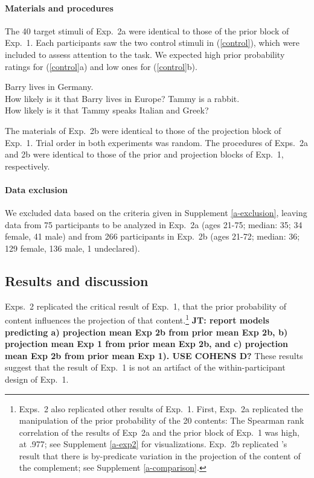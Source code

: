\documentclass[11pt,fleqn]{article}
\newcommand{\6}{\mbox{$[\hspace*{-.6mm}[$}}
\newcommand{\9}{\mbox{$]\hspace*{-.6mm}]$}}
\newcommand{\citepos}[1]{\citeauthor{#1}'s \citeyear{#1}}
\newcommand{\jt}[1]{\textbf{\color{blue}JT: #1}}
\begin{document}
\paragraph{Materials and procedures} The 40 target stimuli of Exp.~2a were identical to those of the prior block of Exp.~1. Each participants saw the two control stimuli in (\ref{control}), which were included to assess attention to the task. We expected high prior probability ratings for (\ref{control}a) and low ones for (\ref{control}b). 

\begin{exe}
\ex\label{control2}
\begin{xlist}
 Barry lives in Germany. \\ How likely is it that Barry lives in Europe?
 Tammy is a rabbit. \\ How likely is it that Tammy speaks Italian and Greek?
\end{xlist}
\end{exe}
The materials of Exp.~2b were identical to those of the projection block of Exp.~1. Trial order in both experiments was random. The procedures of Exps.~2a and 2b were identical to those of the prior and projection blocks of Exp.~1, respectively.

\paragraph{Data exclusion} We excluded data based on the criteria given in Supplement \ref{a-exclusion}, leaving data from 75 participants to be analyzed in Exp.~2a (ages 21-75; median: 35; 34 female, 41 male) and from 266 participants in Exp.~2b (ages 21-72; median: 36; 129 female, 136 male, 1 undeclared).

\subsection{Results and discussion}

Exps.~2 replicated the critical result of Exp.~1, that the prior probability of content influences the projection of that content.\footnote{Exps.~2 also replicated other results of Exp.~1. First, Exp.~2a replicated the manipulation of the prior probability of the 20 contents: The Spearman rank correlation of the results of Exp~2a and the prior block of Exp.~1 was high, at .977; see Supplement \ref{a-exp2} for visualizations. Exp.~2b replicated \citepos{tonhauser-degen-factive} result that there is by-predicate variation in the projection of the content of the complement; see Supplement \ref{a-comparison}.} \jt{report models predicting a) projection mean Exp 2b from prior mean Exp 2b, b) projection mean Exp 1 from prior mean Exp 2b, and c) projection mean Exp 2b from prior mean Exp 1). USE COHENS D?} These results suggest that the result of Exp.~1 is not an artifact of the within-participant design of Exp.~1.
\end{document}
